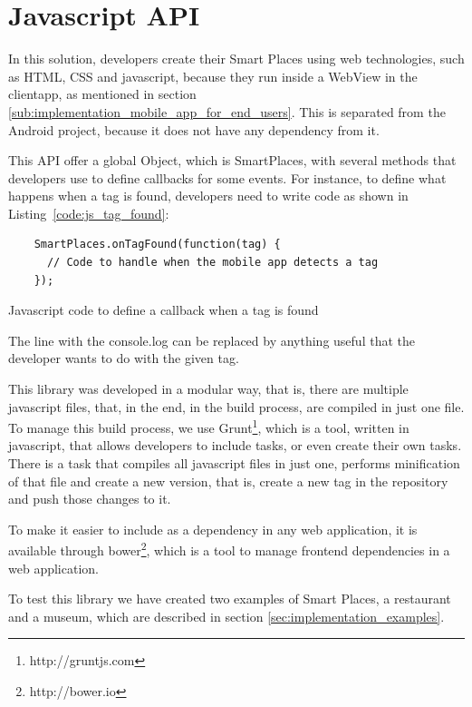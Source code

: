 \section{Javascript API}
\label{sec:javascript_api}
In this solution, developers create their Smart Places using web technologies, such as \gls{HTML}, \gls{CSS} and javascript, because they run inside a WebView in the clientapp, as mentioned in section \ref{sub:implementation_mobile_app_for_end_users}.
This is separated from the Android project, because it does not have any dependency from it.

This \gls{API} offer a global Object, which is SmartPlaces, with several methods that developers use to define callbacks for some events. For instance, to define what happens when a tag is found, developers need to write code as shown in Listing~\ref{code:js_tag_found}:

\begin{listing}[H]
  \begin{verbatim}
    SmartPlaces.onTagFound(function(tag) {
      // Code to handle when the mobile app detects a tag
    });
  \end{verbatim}
  \caption{Javascript code to define a callback when a tag is found}
  \label{code:js_tag_found}
\end{listing}

The line with the console.log can be replaced by anything useful that the developer wants to do with the given tag.

This library was developed in a modular way, that is, there are multiple javascript files, that, in the end, in the build process, are compiled in just one file.
To manage this build process, we use Grunt\footnote{http://gruntjs.com}, which is a tool, written in javascript, that allows developers to include tasks, or even create their own tasks. There is a task that compiles all javascript files in just one, performs minification of that file and create a new version, that is, create a new tag in the repository and push those changes to it.

To make it easier to include as a dependency in any web application, it is available through bower\footnote{http://bower.io}, which is a tool to manage frontend dependencies in a web application.

To test this library we have created two examples of Smart Places, a restaurant and a museum, which are described in section \ref{sec:implementation_examples}.

